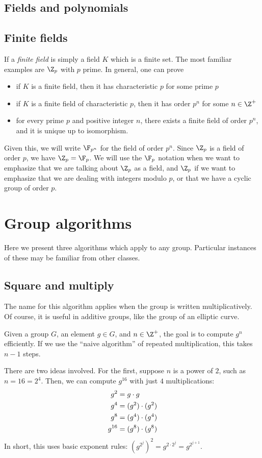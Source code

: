 \documentclass[12pt]{amsart}
\theoremstyle{plain}
\theoremstyle{definition}
\theoremstyle{remark}
\begin{document}
\subsection{Fields and polynomials}

\subsection{Finite fields}

If a \emph{finite field} is simply a field $K$ which is a finite set.
The most familiar examples are $\Z_p$ with $p$ prime.  In general,
one can prove
\begin{itemize}
\item if $K$ is a finite field, then it has characteristic $p$
 for some prime $p$
\item if $K$ is a finite field of characteristic $p$, then it
has order $p^n$ for some $n\in\Z^+$
\item for every prime $p$ and positive integer $n$, there exists
a finite field of order $p^n$, and it is unique up to isomorphism.
\end{itemize}
Given this, we will write $\F_{p^n}$ for the field of order $p^n$.
Since $\Z_p$ is a field of order $p$, we have $\Z_p=\F_p$.  We will
use the $\F_p$ notation when we want to emphasize that we are talking
about $\Z_p$ as a field, and $\Z_p$ if we want to emphasize that we
are dealing with integers modulo $p$, or that we have a cyclic group
of order $p$.


\section{Group algorithms}

Here we present three algorithms which apply to any group.  Particular
instances of these may be familiar from other classes.

\subsection{Square and multiply}
The name for this algorithm applies when the group is written
multiplicatively.  Of course, it is useful in additive groups, like
the group of an elliptic curve.

Given a group $G$, an element $g\in G$, and $n\in\Z^+$, the goal is to
compute $g^n$ efficiently.  If we use the ``naive algorithm'' of
repeated multiplication, this takes $n-1$ steps.

There are two ideas involved.  For the first, suppose $n$ is a power
of $2$, such as $n=16=2^4$.  Then, we can compute $g^{16}$ with just
$4$ multiplications:
\begin{align}
g^2&= g\cdot g \label{sqrs}\\
g^4&= (g^2)\cdot (g^2) \notag\\
g^8&= (g^4)\cdot (g^4) \notag \\
g^{16}&= (g^8)\cdot (g^8) \notag
\end{align}
In short, this uses basic exponent rules: $(g^{2^j})^2=g^{2\cdot
  2^j}=g^{2^{j+1}}$.
\end{document}
